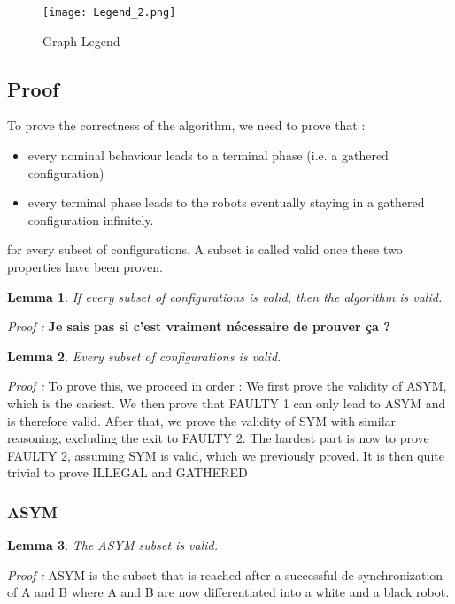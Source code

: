 \documentclass[11pt]{article}
\newtheorem{Lemma}{Lemma}
\begin{document}
\begin{figure}[htb]
	\centering
	\texttt{[image: Legend\_2.png]}
	\caption{Graph Legend}
\end{figure}
\pagebreak

\subsection{Proof}


To prove the correctness of the algorithm, we need to prove that : 

\begin{itemize}
\item every nominal behaviour leads to a terminal phase (i.e. a gathered configuration)
\item every terminal phase leads to the robots eventually staying in a gathered configuration infinitely.
\end{itemize}

for every subset of configurations. A subset is called valid once these two properties have been proven.
\begin{Lemma}
If every subset of configurations is valid, then the algorithm is valid.
\end{Lemma}


\textit{Proof :} \textbf{Je sais pas si c'est vraiment nécessaire de prouver ça ? }


\begin{Lemma}
Every subset of configurations is valid.
\end{Lemma}

\textit{Proof :} To prove this, we proceed in order : We first prove the validity of ASYM, which is the easiest. We then prove that FAULTY 1 can only lead to ASYM and is therefore valid. After that, we prove the validity of SYM with similar reasoning, excluding the exit to FAULTY 2. The hardest part is now to prove FAULTY 2, assuming SYM is valid, which we previously proved. It is then quite trivial to prove ILLEGAL and GATHERED

\subsubsection{ASYM}

\begin{Lemma}
The ASYM subset is valid.
\end{Lemma}


\textit{Proof :} ASYM is the subset that is reached after a successful de-synchronization of A and B where A and B are now differentiated into a white and a black robot.
\end{document}
